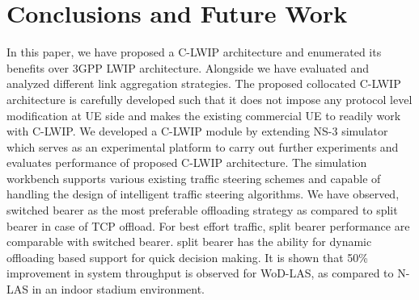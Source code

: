 \documentclass[conference]{IEEEtran}
\begin{document}
\section{Conclusions and Future Work}
\label{sec:conclusion}

In this paper, we have proposed a C-LWIP architecture and enumerated its benefits over 3GPP LWIP architecture. Alongside we have evaluated and analyzed different link aggregation strategies. The proposed collocated C-LWIP architecture is carefully developed such that it does not impose any protocol level modification at UE side and makes the existing commercial UE to readily work with C-LWIP. We developed a C-LWIP module by extending NS-3 simulator which serves as an experimental platform to carry out further experiments and evaluates performance of proposed C-LWIP architecture. The simulation workbench supports various existing traffic steering schemes and capable of handling the design of intelligent traffic steering algorithms. We have observed, switched bearer as the most preferable offloading strategy as compared to split bearer in case of TCP offload. For best effort traffic, split bearer performance are comparable with switched bearer. split bearer has the ability for dynamic offloading based support for quick decision making. It is shown that 50\% improvement in system throughput is observed for WoD-LAS, as compared to N-LAS in an indoor stadium environment.




\end{document}
